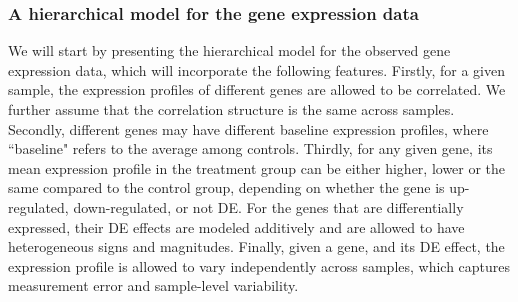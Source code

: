 \documentclass[a4,center,fleqn]{NAR}
\begin{document}
	\subsubsection{A hierarchical model for the gene expression data}\label{subsection:YModel}
	We will start by presenting the hierarchical model for the observed gene expression data, which
	will incorporate the following features. 
	Firstly, for a given sample, the expression profiles of different genes are allowed to be
	correlated. We further assume that the correlation structure is the same across samples. Secondly,
	different genes may have different baseline expression profiles, where ``baseline" refers to the
	average among controls. Thirdly, for any given gene, its mean expression profile in the treatment
	group can be either higher, lower or the same compared to the control group, depending on whether
	the gene is up-regulated, down-regulated, or not DE. For the genes that are differentially
	expressed, their DE effects are modeled additively and are allowed to have heterogeneous signs and
	magnitudes. Finally, given a gene, and its DE effect, the expression profile is allowed to vary
	independently across samples, which captures measurement error and sample-level variability.
	
\end{document}

